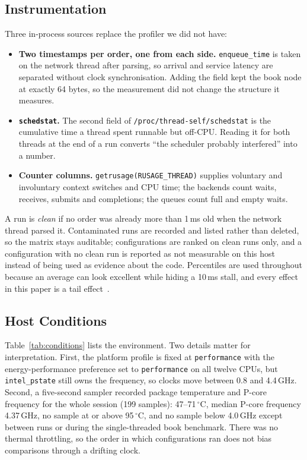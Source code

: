 \documentclass[conference]{IEEEtran}
\begin{document}
\subsection{Instrumentation}
Three in-process sources replace the profiler we did not have:

\begin{itemize}
\item \textbf{Two timestamps per order, one from each side.} \texttt{enqueue\_time}
is taken on the network thread after parsing, so arrival and service latency are
separated without clock synchronisation. Adding the field kept the book node at
exactly 64 bytes, so the measurement did not change the structure it measures.
\item \textbf{\texttt{schedstat}.} The second field of
\texttt{/proc/thread-self/schedstat} is the cumulative time a thread spent
runnable but off-CPU. Reading it for both threads at the end of a run converts
``the scheduler probably interfered'' into a number.
\item \textbf{Counter columns.} \texttt{getrusage(RUSAGE\_THREAD)} supplies
voluntary and involuntary context switches and CPU time; the backends count
waits, receives, submits and completions; the queues count full and empty waits.
\end{itemize}

A run is \emph{clean} if no order was already more than 1\,ms old when the
network thread parsed it. Contaminated runs are recorded and listed rather than
deleted, so the matrix stays auditable; configurations are ranked on clean runs
only, and a configuration with no clean run is reported as not measurable on
this host instead of being used as evidence about the code. Percentiles are used
throughout because an average can look excellent while hiding a 10\,ms stall,
and every effect in this paper is a tail effect~\cite{gregg}.

\subsection{Host Conditions}
Table~\ref{tab:conditions} lists the environment. Two details matter for
interpretation. First, the platform profile is fixed at \texttt{performance}
with the energy-performance preference set to \texttt{performance} on all twelve
CPUs, but \texttt{intel\_pstate} still owns the frequency, so clocks move
between 0.8 and 4.4\,GHz. Second, a five-second sampler recorded package
temperature and P-core frequency for the whole session (199 samples):
47--71\,$^\circ$C, median P-core frequency 4.37\,GHz, no sample at or above
95\,$^\circ$C, and no sample below 4.0\,GHz except between runs or during the
single-threaded book benchmark. There was no thermal throttling, so the order in
which configurations ran does not bias comparisons through a drifting clock.
\end{document}
